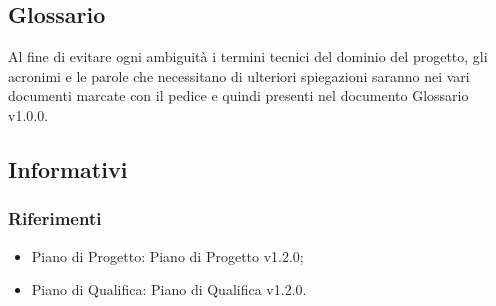\subsection{Glossario}
Al fine di evitare ogni ambiguità i termini tecnici del dominio del progetto, gli acronimi e le parole che necessitano di ulteriori spiegazioni saranno nei vari documenti marcate con il pedice  e quindi presenti nel documento Glossario v1.0.0.

\subsection{Informativi}
\subsubsection{Riferimenti}
\begin{itemize}
\item
Piano di Progetto: Piano di Progetto v1.2.0;
\item
Piano di Qualifica: Piano di Qualifica v1.2.0.
\end{itemize}